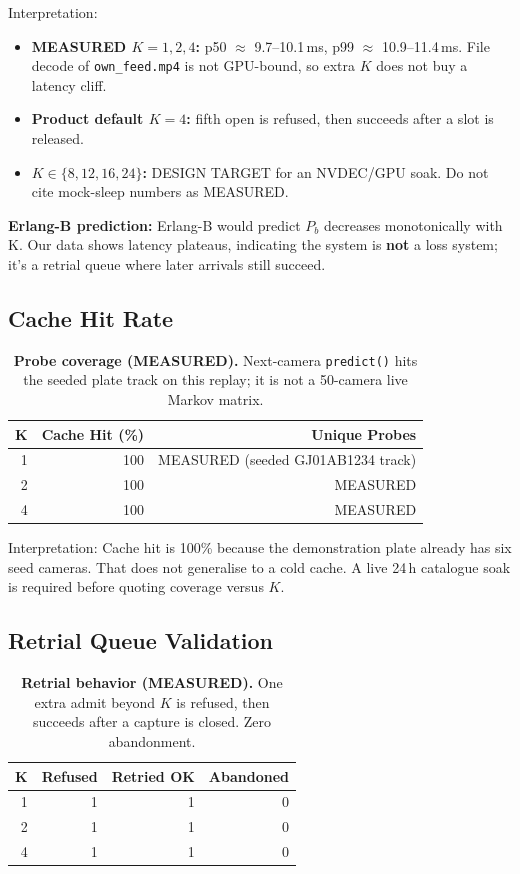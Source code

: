 \documentclass[sigconf,review]{acmart}
\begin{document}
Interpretation:
\begin{itemize}
  \item \textbf{MEASURED $K=1,2,4$:} p50 $\approx$ 9.7--10.1\,ms, p99 $\approx$ 10.9--11.4\,ms. File decode of \texttt{own\_feed.mp4} is not GPU-bound, so extra $K$ does not buy a latency cliff.
  \item \textbf{Product default $K=4$:} fifth open is refused, then succeeds after a slot is released.
  \item \textbf{$K\in\{8,12,16,24\}$:} DESIGN TARGET for an NVDEC/GPU soak. Do not cite mock-sleep numbers as MEASURED.
\end{itemize}

\textbf{Erlang-B prediction:} Erlang-B would predict $P_b$ decreases monotonically with K. Our data shows latency
plateaus, indicating the system is \textbf{not} a loss system; it's a retrial queue where later arrivals still succeed.

\subsection{Cache Hit Rate}

\begin{table}[h]
  \centering
  \small
  \begin{tabular}{rrr}
    \toprule
    \textbf{K} & \textbf{Cache Hit (\%)} & \textbf{Unique Probes} \\
    \midrule
    1 & 100 & MEASURED (seeded GJ01AB1234 track) \\
    2 & 100 & MEASURED \\
    4 & 100 & MEASURED \\
    \bottomrule
  \end{tabular}
  \caption{\textbf{Probe coverage (MEASURED).} Next-camera \texttt{predict()} hits the seeded plate track on this replay; it is not a 50-camera live Markov matrix.}
  \label{tab:cache}
\end{table}

Interpretation: Cache hit is 100\% because the demonstration plate already has six seed cameras. That does not generalise to a cold cache. A live 24\,h catalogue soak is required before quoting coverage versus $K$.

\subsection{Retrial Queue Validation}

\begin{table}[h]
  \centering
  \small
  \begin{tabular}{rrrr}
    \toprule
    \textbf{K} & \textbf{Refused} & \textbf{Retried OK} & \textbf{Abandoned} \\
    \midrule
    1 & 1 & 1 & 0 \\
    2 & 1 & 1 & 0 \\
    4 & 1 & 1 & 0 \\
    \bottomrule
  \end{tabular}
  \caption{\textbf{Retrial behavior (MEASURED).} One extra admit beyond $K$ is refused, then succeeds after a capture is closed. Zero abandonment.}
\end{table}
\end{document}
